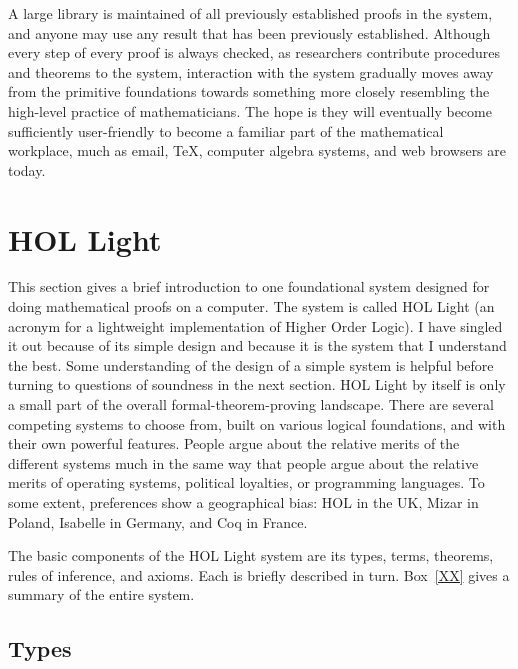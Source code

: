 \documentclass{llncs}
\begin{document}
A large library is maintained
of all previously established proofs in the system, and anyone may
use any result that has been previously established.
 Although every step of every proof is
always checked,
as researchers contribute procedures and theorems to the system,
interaction with the system gradually moves
away from the primitive foundations towards something more closely
resembling the high-level practice of mathematicians.
%
The hope
is they will eventually become sufficiently user-friendly
to become a familiar part of the 
mathematical workplace, much as email, \TeX\relax, computer algebra systems, and
web browsers are today.






\section{HOL Light}


This section gives a brief introduction to one foundational
system designed for doing mathematical proofs on a computer.
The system is called HOL Light
(an acronym for a lightweight implementation of Higher Order Logic).
I have singled it out because of its simple design and because it is
the system that I understand the best.
Some understanding of the design of a simple system is helpful before
turning to questions of soundness in the next section.
HOL Light by itself is only a small part of the overall formal-theorem-proving
landscape.
There are several competing systems to choose from, 
built on various logical foundations, and
 with their own powerful features.
People argue about the relative merits of the
different systems much in the same way that people argue about the relative merits
of operating systems, political loyalties, or programming languages.  To some extent, preferences
show a geographical bias:  HOL in the UK, Mizar in Poland, Isabelle in Germany, and
Coq in France.





The basic components of the HOL Light system are its types, terms, theorems,
rules of inference, and
axioms.  Each is briefly described in turn.  Box~\ref{XX} gives a summary
of the entire system.  

\subsection{Types}
\end{document}
